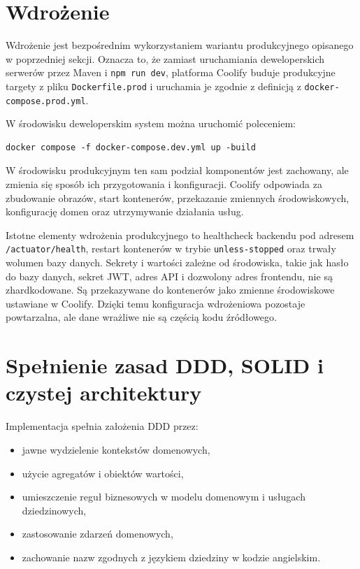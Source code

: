 \section{Wdrożenie}

Wdrożenie jest bezpośrednim wykorzystaniem wariantu produkcyjnego opisanego w poprzedniej sekcji. Oznacza to, że zamiast uruchamiania deweloperskich serwerów przez Maven i \texttt{npm run dev}, platforma Coolify buduje produkcyjne targety z pliku \texttt{Dockerfile.prod} i uruchamia je zgodnie z definicją z \texttt{docker-compose.prod.yml}.

W środowisku deweloperskim system można uruchomić poleceniem:

\begin{verbatim}
docker compose -f docker-compose.dev.yml up -build
\end{verbatim}

W środowisku produkcyjnym ten sam podział komponentów jest zachowany, ale zmienia się sposób ich przygotowania i konfiguracji. Coolify odpowiada za zbudowanie obrazów, start kontenerów, przekazanie zmiennych środowiskowych, konfigurację domen oraz utrzymywanie działania usług.

Istotne elementy wdrożenia produkcyjnego to healthcheck backendu pod adresem \texttt{/actuator/health}, restart kontenerów w trybie \texttt{unless-stopped} oraz trwały wolumen bazy danych. Sekrety i wartości zależne od środowiska, takie jak hasło do bazy danych, sekret JWT, adres API i dozwolony adres frontendu, nie są zhardkodowane. Są przekazywane do kontenerów jako zmienne środowiskowe ustawiane w Coolify. Dzięki temu konfiguracja wdrożeniowa pozostaje powtarzalna, ale dane wrażliwe nie są częścią kodu źródłowego.

\section{Spełnienie zasad DDD, SOLID i czystej architektury}

Implementacja spełnia założenia DDD przez:
\begin{itemize}
    \item jawne wydzielenie kontekstów domenowych,
    \item użycie agregatów i obiektów wartości,
    \item umieszczenie reguł biznesowych w modelu domenowym i usługach dziedzinowych,
    \item zastosowanie zdarzeń domenowych,
    \item zachowanie nazw zgodnych z językiem dziedziny w kodzie angielskim.
\end{itemize}

